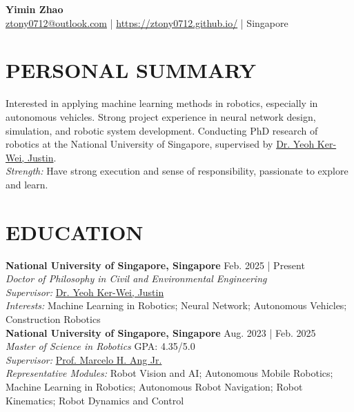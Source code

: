 \documentclass[a4paper,9pt]{extarticle}
\begin{document}
\pagestyle{fancy}
\renewcommand{\headrulewidth}{0pt}
\fancyhead{}
\fancyhead[R]{\textit{\today}}
\thispagestyle{empty} %

\begin{center}
\textbf{\Huge Yimin Zhao}\\ %

\faEnvelope \href{mailto:ztony0712@outlook.com}{ztony0712@outlook.com} | 
\faGlobe \href{https://ztony0712.github.io/}{https://ztony0712.github.io/} | 
\faUniversity Singapore %
\end{center}

\section*{PERSONAL SUMMARY}
\noindent
Interested in applying machine learning methods in robotics, especially in autonomous vehicles. Strong project experience in neural network design, simulation, and robotic system development. Conducting PhD research of robotics at the National University of Singapore, supervised by \href{https://cde.nus.edu.sg/cee/staff/yeoh-ker-wei-justin/}{Dr. Yeoh Ker-Wei, Justin}. \\

\noindent
\textit{Strength:} Have strong execution and sense of responsibility, passionate to explore and learn.

\section*{EDUCATION}
\noindent
\textbf{National University of Singapore, Singapore} \hfill Feb. 2025 | Present \\ %
\textit{Doctor of Philosophy in Civil and Environmental Engineering} \hfill   \\
\textit{Supervisor:} \href{https://cde.nus.edu.sg/cee/staff/yeoh-ker-wei-justin/}{Dr. Yeoh Ker-Wei, Justin} \\
\textit{Interests:} Machine Learning in Robotics; Neural Network; Autonomous Vehicles; Construction Robotics \\

\noindent
\textbf{National University of Singapore, Singapore} \hfill Aug. 2023 | Feb. 2025 \\ %
\textit{Master of Science in Robotics} \hfill GPA: 4.35/5.0 \\
\textit{Supervisor:} \href{https://guppy.mpe.nus.edu.sg/~mpeangh/}{Prof. Marcelo H. Ang Jr.} \\
\textit{Representative Modules:} Robot Vision and AI; Autonomous Mobile Robotics; Machine Learning in Robotics; Autonomous Robot Navigation; Robot Kinematics; Robot Dynamics and Control  \\
\end{document}
